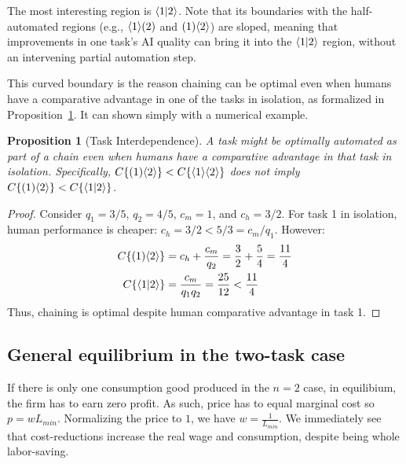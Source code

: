 \documentclass{article}
\theoremstyle{plain}
\theoremstyle{plain}
\newtheorem{proposition}[theorem]{Proposition}
\begin{document}
The most interesting region is $\langle 1|2 \rangle$.
Note that its boundaries with the half-automated regions (e.g., $\langle 1 \rangle( 2 )$ and $( 1 )\langle 2 \rangle$) are sloped, meaning that improvements in one task's AI quality can bring it into the $\langle 1|2 \rangle$ region, without an intervening partial automation step.

This curved boundary is the reason chaining can be optimal even when humans have a comparative advantage in one of the tasks in isolation, as formalized in Proposition~\ref{proposition:interdependence}.
It can shown simply with a numerical example.

\begin{proposition}[Task Interdependence] \label{proposition:interdependence}
A task might be optimally automated as part of a chain even when humans have a comparative advantage in that task in isolation.
Specifically, $C\{ ( 1 )\langle 2 \rangle \} < C\{ \langle 1 \rangle\langle 2 \rangle \}$ does not imply $C\{ ( 1 )\langle 2 \rangle \} < C\{ \langle 1|2 \rangle \}$.
\end{proposition}
\begin{proof}
Consider $q_1 = 3/5$, $q_2 = 4/5$, $c_m = 1$, and $c_h = 3/2$.
For task 1 in isolation, human performance is cheaper: $c_h = 3/2 < 5/3 = c_m/q_1$.
However:
\begin{align*}
    C\{ ( 1 )\langle 2 \rangle \} &= c_h + \frac{c_m}{q_2} = \frac{3}{2} + \frac{5}{4} = \frac{11}{4} \\
    C\{ \langle 1|2 \rangle \} &= \frac{c_m}{q_1q_2} = \frac{25}{12} < \frac{11}{4}
\end{align*}
Thus, chaining is optimal despite human comparative advantage in task 1.
\end{proof}

\subsection{General equilibrium in the two-task case}
If there is only one consumption good produced in the $n=2$ case, in equilibium, the firm has to earn zero profit. 
As such, price has to equal marginal cost so $p = w L_{min}$. 
Normalizing the price to $1$, we have $w = \frac{1}{L_{min}}$.
We immediately see that cost-reductions increase the real wage and consumption, despite being whole labor-saving. 
\end{document}
